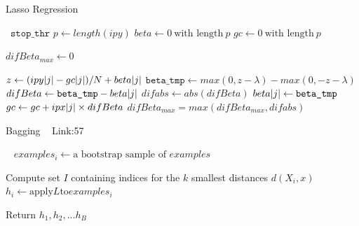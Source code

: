 \documentclass[a4paper]{article}
\begin{document}
 \begin{algorithm}
 
   \caption{Lasso Regression }
    \begin{algorithmic}[1]
      \
      \State $\texttt{stop\_thr}$ 
      \State $p \leftarrow length(ipy)$
      \State $beta \leftarrow 0 \ \text{with length} \ p$
\State $gc \leftarrow 0 \ \text{with length} \ p$
 
 \State $difBeta_{max} \leftarrow  0 $
 
 \State $z \leftarrow (ipy\abs{j} - gc\abs{j})/N +beta\abs{j}$
 \State $\texttt{beta\_tmp} \leftarrow max(0,z-\lambda)- max(0,-z-\lambda) $
 \State $difBeta \leftarrow \texttt{beta\_tmp}  - beta\abs{j}$
 \State $difabs \leftarrow abs(difBeta)$
  \State $beta\abs{j} \leftarrow \texttt{beta\_tmp} $ 
  \State $gc \leftarrow gc + ipx\abs{j} \times difBeta$
  \State $difBeta_{max} = max(difBeta_{max},difabs)$
  \EndIf
 \EndFor
\EndWhile


 \EndFunction

\end{algorithmic}
\end{algorithm}


  \begin{algorithm}
 
   \caption{Bagging ~\cite{bagging1 } Link:57}
    \begin{algorithmic}[1]
      \
            \State $examples_{i} \leftarrow \text{a bootstrap sample of }  examples$
        \EndFor
        
         \State Compute set $I$ containing indices for the $k$ smallest distances $d{(X_i,x)}$
         \State $h_i  \leftarrow \text{apply} L \text{to} examples_{i}$
     
       \State Return $h_{1},h_{2},...h_{B}$



 \EndFunction
 
 \end{algorithmic}
\end{algorithm}
\end{document}
